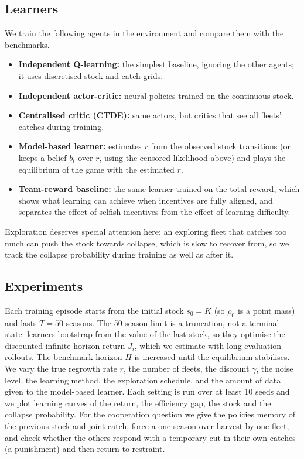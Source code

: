 \documentclass{article}
\begin{document}
\subsection{Learners}
We train the following agents in the environment and compare them with the benchmarks.
\begin{itemize}
\item \textbf{Independent Q-learning:} the simplest baseline, ignoring the other agents; it uses discretised stock and catch grids.
\item \textbf{Independent actor-critic:} neural policies trained on the continuous stock.
\item \textbf{Centralised critic (CTDE):} same actors, but critics that see all fleets' catches during training.
\item \textbf{Model-based learner:} estimates $r$ from the observed stock transitions (or keeps a belief $b_t$ over $r$, using the censored likelihood above) and plays the equilibrium of the game with the estimated $r$.
\item \textbf{Team-reward baseline:} the same learner trained on the total reward, which shows what learning can achieve when incentives are fully aligned, and separates the effect of selfish incentives from the effect of learning difficulty.
\end{itemize}
Exploration deserves special attention here: an exploring fleet that catches too much can push the stock towards collapse, which is slow to recover from, so we track the collapse probability during training as well as after it.

\subsection{Experiments}
Each training episode starts from the initial stock $s_0=K$ (so $\rho_0$ is a point mass) and lasts $T=50$ seasons. The 50-season limit is a truncation, not a terminal state: learners bootstrap from the value of the last stock, so they optimise the discounted infinite-horizon return $J_i$, which we estimate with long evaluation rollouts. The benchmark horizon $H$ is increased until the equilibrium stabilises. We vary the true regrowth rate $r$, the number of fleets, the discount $\gamma$, the noise level, the learning method, the exploration schedule, and the amount of data given to the model-based learner. Each setting is run over at least 10 seeds and we plot learning curves of the return, the efficiency gap, the stock and the collapse probability. For the cooperation question we give the policies memory of the previous stock and joint catch, force a one-season over-harvest by one fleet, and check whether the others respond with a temporary cut in their own catches (a punishment) and then return to restraint.
\end{document}
